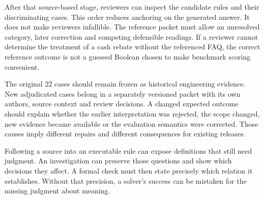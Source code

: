 
After that source-based stage, reviewers can inspect the candidate rules and
their discriminating cases. This order reduces anchoring on the generated
answer. It does not make reviewers infallible. The reference packet must allow
an unresolved category, later correction and competing defensible readings.
If a reviewer cannot determine the treatment of a cash rebate without the
referenced FAQ, the correct reference outcome is not a guessed Boolean chosen
to make benchmark scoring convenient.

The original 22 cases should remain frozen as historical engineering evidence.
New adjudicated cases belong in a separately versioned packet with its own
authors, source context and review decisions. A changed expected outcome should
explain whether the earlier interpretation was rejected, the scope changed,
new evidence became available or the evaluation semantics were corrected.
Those causes imply different repairs and different consequences for existing
releases.

Following a source into an executable rule can expose definitions that still
need judgment. An investigation can preserve those questions and show which
decisions they affect. A formal check must then state precisely which relation
it establishes. Without that precision, a solver's success can be mistaken for
the missing judgment about meaning.
